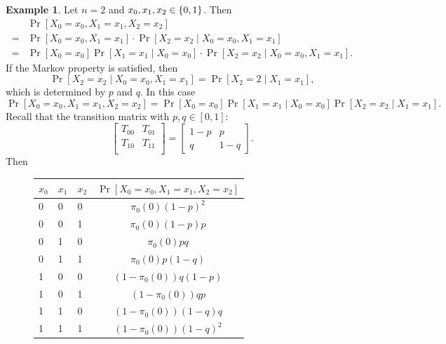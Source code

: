 \documentclass[12pt,openany]{book}
\theoremstyle{definition}
\newtheorem{example}{Example}[chapter]
\begin{document}
	\newpage
	\begin{example}
		Let $n=2$ and $x_0,x_1,x_2\in\set{0,1}$. Then \begin{align*}
			&\Pr[X_0=x_0,X_1=x_1,X_2=x_2]\\=&
			\Pr[X_0=x_0,X_1=x_1]\cdot\Pr[X_2=x_2\mid X_0=x_0,X_1=x_1]\\=&
			\Pr[X_0=x_0]\Pr[X_1=x_1\mid X_0=x_0]\cdot\Pr[X_2=x_2\mid X_0=x_0,X_1=x_1].
		\end{align*} If the Markov property is satisfied, then \[
		\Pr[X_2=x_2\mid X_0=x_0,X_1=x_1]=\Pr[X_2=2\mid X_1=x_1],
	\] which is determined by $p$ and $q$. In this case \[
	\Pr[X_0=x_0,X_1=x_1,X_2=x_2]=\Pr[X_0=x_0]\Pr[X_1=x_1\mid X_0=x_0]\Pr[X_2=x_2\mid X_1=x_1].
	\] Recall that the transition matrix with $p,q\in[0,1]$: \[
	\begin{bmatrix}
		T_{00} & T_{01}\\
		T_{10} & T_{11}\\
	\end{bmatrix}=\begin{bmatrix}
		1-p & p\\
		q & 1-q
	\end{bmatrix}.
	\] Then \begin{figure}[h!]\centering\renewcommand*{\arraystretch}{1.4}
		\begin{tabularx}{\textwidth}{XXX|c}
			\toprule[1.2pt]
			$x_0$ &$x_1$& $x_2$ & $\Pr[X_0=x_0,X_1=x_1,X_2=x_2]$\\
			\midrule
			0& 0& 0     &$\pi_0(0)(1-p)^2$\\
			\hline
			0& 0& 1     &$\pi_0(0)(1-p)p$\\
			\hline
			0& 1& 0     &$\pi_0(0)pq$\\
			\hline
			0& 1& 1     &$\pi_0(0)p(1-q)$\\
			\hline
			\hline
			1& 0& 0     &$(1-\pi_0(0))q(1-p)$\\
			\hline
			1& 0& 1     &$(1-\pi_0(0))qp$\\
			\hline
			1& 1& 0     &$(1-\pi_0(0))(1-q)q$\\
			\hline
			1& 1& 1     &$(1-\pi_0(0))(1-q)^2$\\
			\bottomrule[1.2pt]
		\end{tabularx}
	\end{figure}
	\end{example}
	
\end{document}
